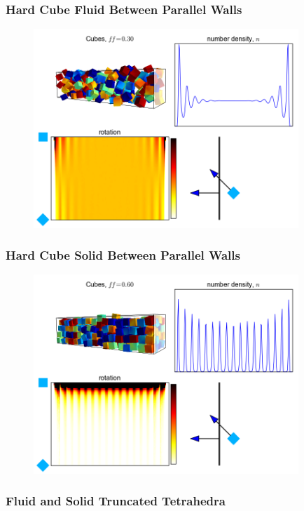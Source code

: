 \documentclass[]{beamer}
\begin{document}
\begin{frame}
  \frametitle{Hard Cube Fluid Between Parallel Walls}
  \begin{figure}[h]
    \centering
    \includegraphics[width=100mm]{figs/cube-density-30}
  \end{figure}
\end{frame}

\begin{frame}
  \frametitle{Hard Cube Solid Between Parallel Walls}
  \begin{figure}[h]
    \centering
    \includegraphics[width=100mm]{figs/cube-density-60}
  \end{figure}
\end{frame}

\begin{frame}
  \frametitle{Fluid and Solid Truncated Tetrahedra}
  \begin{figure}[h]
    \centering
{} 
  \end{figure}
\end{frame}
\end{document}
